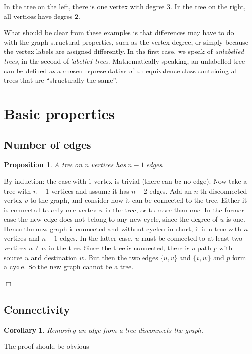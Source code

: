 \documentclass[a4paper]{book}
\theoremstyle{changebreak}                %
\newtheorem{cor}[result]{Corollary}
\newtheorem{prop}[result]{Proposition}
\newenvironment{proof}
 {{\sl Proof.}\hspace*{1 ex}}%
 {{\nopagebreak\hspace*{\fill}$\Box$\par\vspace{12pt}}}
\begin{document}
In the tree on the left, there is one vertex with degree 3.
In the tree on the right, all vertices have degree 2.

What should be clear from these examples is that differences may have
to do with the graph structural properties, such as the vertex degree,
or simply because the vertex labels are assigned differently. In the
first case, we speak of {\it unlabelled trees},
in the second of {\it labelled
  trees}. Mathematically speaking, an unlabelled
tree can be defined as a chosen representative of an equivalence class
containing all trees that are ``structurally the same''.

\section{Basic properties}
\label{s:tree:basicprop}

\subsection{Number of edges}
\begin{prop}
A tree on $n$ vertices has $n-1$ edges. \label{thm:tree}
\end{prop}
\begin{proof}
By induction: the case with 1 vertex is trivial (there
can be no edge).  Now take a tree with $n-1$ vertices and assume it
has $n-2$ edges.   Add an $n$-th disconnected
vertex $v$ to the graph, and consider how
it can be connected to the tree. Either it is connected to
only one vertex $u$ in the tree, or to more than one. In the former
case the new edge does not belong to any new cycle, since
the degree of $u$ is one.  Hence
the new graph is connected and without cycles: in short, it is a tree
with $n$ vertices and $n-1$ edges. In the latter case, $u$ must be
connected to at least two vertices $u\not=w$ in the tree. Since the
tree is connected, there is a path $p$ with source $u$ and
destination $w$. But then the two edges
$\{u,v\}$ and $\{v,w\}$ and $p$ form a cycle. So the new graph cannot
be a tree.
\end{proof}

\subsection{Connectivity}
\begin{cor}
Removing an edge from a tree disconnects the graph.
\end{cor}
The proof should be obvious.
\end{document}
